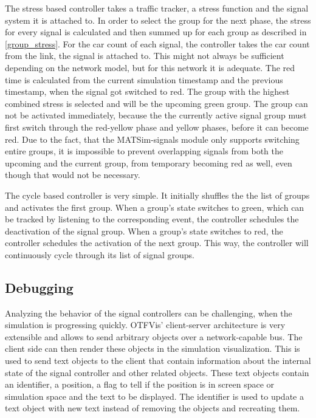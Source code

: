 The stress based controller takes a traffic tracker, a stress function and the signal system it is attached to. In order to select the group for the next phase, the stress for every signal is calculated and then summed up for each group as described in \autoref{group_stress}. For the car count of each signal, the controller takes the car count from the link, the signal is attached to. This might not always be sufficient depending on the network model, but for this network it is adequate. The red time is calculated from the current simulation timestamp and the previous timestamp, when the signal got switched to red. The group with the highest combined stress is selected and will be the upcoming green group. The group can not be activated immediately, because the the currently active signal group must first switch through the red-yellow phase and yellow phases, before it can become red. Due to the fact, that the MATSim-signals module only supports switching entire groups, it is impossible to prevent overlapping signals from both the upcoming and the current group, from temporary becoming red as well, even though that would not be necessary.

The cycle based controller is very simple. It initially shuffles the the list of groups and activates the first group. When a group's state switches to green, which can be tracked by listening to the corresponding event, the controller schedules the deactivation of the signal group. When a group's state switches to red, the controller schedules the activation of the next group. This way, the controller will continuously cycle through its list of signal groups.

\subsection{Debugging}

Analyzing the behavior of the signal controllers can be challenging, when the simulation is progressing quickly. OTFVis' client-server architecture is very extensible and allows to send arbitrary objects over a network-capable bus. The client side can then render these objects in the simulation visualization. This is used to send text objects to the client that contain information about the internal state of the signal controller and other related objects. These text objects contain an identifier, a position, a flag to tell if the position is in screen space or simulation space and the text to be displayed. The identifier is used to update a text object with new text instead of removing the objects and recreating them.

